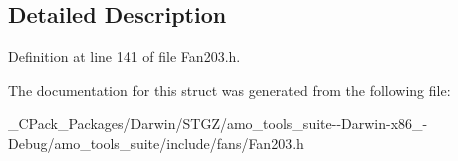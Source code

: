 \subsection{Detailed Description}


Definition at line 141 of file Fan203.\+h.



The documentation for this struct was generated from the following file\+:\begin{DoxyCompactItemize}
\item 
\+\_\+\+C\+Pack\+\_\+\+Packages/\+Darwin/\+S\+T\+G\+Z/amo\+\_\+tools\+\_\+suite-\/-\/\+Darwin-\/x86\+\_-\/\+Debug/amo\+\_\+tools\+\_\+suite/include/fans/Fan203.\+h\end{DoxyCompactItemize}
